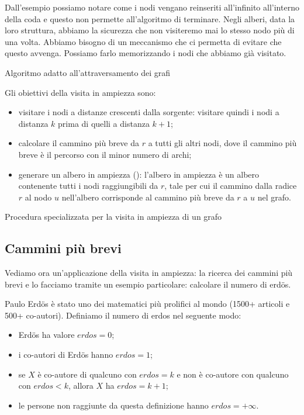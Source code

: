 Dall'esempio possiamo notare come i nodi vengano reinseriti all'infinito all'interno della coda e questo non permette all'algoritmo di terminare.
Negli alberi, data la loro struttura, abbiamo la sicurezza che non visiteremo mai lo stesso nodo più di una volta.
Abbiamo bisogno di un meccanismo che ci permetta di evitare che questo avvenga.
Possiamo farlo memorizzando i nodi che abbiamo già visitato.

\begin{algorithm}[H]
	\caption{Algoritmo adatto all'attraversamento dei grafi}
	
\end{algorithm}

\clearpage
Gli obiettivi della visita in ampiezza sono:
\begin{itemize}
	\item visitare i nodi a distanze crescenti dalla sorgente: visitare quindi i nodi a distanza \(k\) prima di quelli a distanza \(k+1\);
	\item calcolare il cammino più breve da \(r\) a tutti gli altri nodi, dove il cammino più breve è il percorso con il minor numero di archi;
	\item generare un albero in ampiezza (): l'albero in ampiezza è un albero contenente tutti i nodi raggiungibili da \(r\), tale per cui il cammino dalla radice \(r\) al nodo \(u\) nell'albero corrisponde al cammino più breve da \(r\) a \(u\) nel grafo.
\end{itemize}

\begin{algorithm}[H]
	\caption{Procedura specializzata per la visita in ampiezza di un grafo}
	
\end{algorithm}

\clearpage
\subsection{Cammini più brevi}

Vediamo ora un'applicazione della visita in ampiezza: la ricerca dei cammini più brevi e lo facciamo tramite un esempio particolare: calcolare il numero di erd\"{o}s.

Paulo Erd\"{o}s è stato uno dei matematici più prolifici al mondo (1500+ articoli e 500+ co-autori).
Definiamo il numero di erdos nel seguente modo:
\begin{itemize}
	\item Erd\"{o}s ha valore \(erdos = 0\);
	\item i co-autori di Erd\"{o}s hanno \(erdos = 1\);
	\item se \(X\) è co-autore di qualcuno con \(erdos = k\) e non è co-autore con qualcuno con \(erdos < k\), allora \(X\) ha \(erdos = k+1\);
	\item le persone non raggiunte da questa definizione hanno \(erdos = +\infty\).
\end{itemize}

